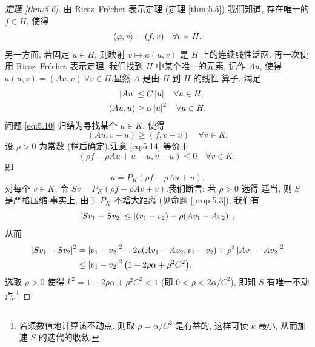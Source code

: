 \begin{proof}[定理 \ref{thm:5.6}]
由 Riesz--Fréchet 表示定理 (定理  \ref{thm:5.5}) 我们知道, 存在唯一的 $f\in H$,
使得
\begin{equation*}
\left\langle \varphi,v\right\rangle=(f,v)\quad\forall v\in H.
\end{equation*}
另一方面, 若固定 $u\in H$, 则映射 $v\mapsto a(u,v)$ 是 $H$ 上的连续线性泛函.
再一次使用 Riesz--Fréchet 表示定理, 我们找到 $H$ 中某个唯一的元素, 记作
$Au$, 使得 $a(u,v)=(Au,v)\ \forall v\in H$.显然 $A$ 是由 $H$ 到 $H$ 的线性
算子, 满足
\begin{align}
\left|Au\right|&\le C\left|u\right|\quad\forall u\in H,\label{eq:5.12}\\
(Au,u)&\ge\alpha\left|u\right|^2\quad\forall u\in H.\label{eq:5.13}
\end{align}
问题 \eqref{eq:5.10} 归结为寻找某个 $u\in K$, 使得
\begin{equation}
(Au,v-u)\ge(f,v-u)\quad\forall v\in K.
\label{eq:5.14}
\end{equation}
设 $\rho>0$ 为常数 (稍后确定).注意 \eqref{eq:5.14} 等价于
\begin{equation}
(\rho f-\rho Au+u-u,v-u)\le0\quad\forall v\in K,
\label{eq:5.15}
\end{equation}
即
\begin{equation*}
u=P_K(\rho f-\rho Au+u).
\end{equation*}
对每个 $v\in K$, 令 $Sv=P_K(\rho f-\rho Av+v)$.我们断言: 若 $\rho>0$ 选得
适当, 则 $S$ 是严格压缩.事实上, 由于 $P_K$ 不增大距离 (见命题  \ref{prop:5.3}),
我们有
\begin{equation*}
\left|Sv_1-Sv_2\right|\le\left|(v_1-v_2)-\rho(Av_1-Av_2)\right|,
\end{equation*}
从而
\begin{align*}
\left|Sv_1-Sv_2\right|^2
&=\left|v_1-v_2\right|^2-2\rho(Av_1-Av_2,v_1-v_2)+\rho^2\left|Av_1-Av_2\right|^2\\
&\le\left|v_1-v_2\right|^2\bigl(1-2\rho\alpha+\rho^2C^2\bigr).
\end{align*}
选取 $\rho>0$ 使得 $k^2=1-2\rho\alpha+\rho^2C^2<1$ (即
$0<\rho<2\alpha/C^2$), 即知 $S$ 有唯一不动点.\footnote{若须数值地计算该不动点,
则取 $\rho=\alpha/C^2$ 是有益的, 这样可使 $k$ 最小, 从而加速 $S$ 的迭代的收敛.}


\end{proof}
